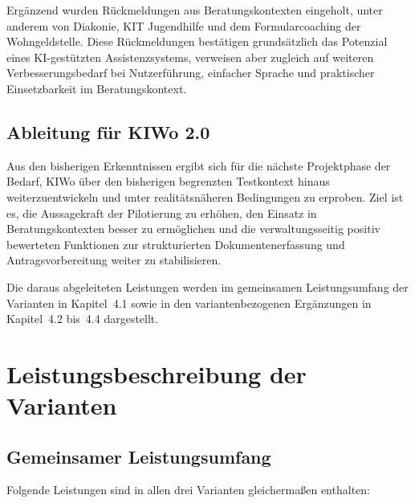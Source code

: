 \documentclass[11pt,a4paper,openany]{report}
\begin{document}
Ergänzend wurden Rückmeldungen aus Beratungskontexten eingeholt, unter
anderem von Diakonie, KIT Jugendhilfe und dem Formularcoaching der
Wohngeldstelle. Diese Rückmeldungen bestätigen grundsätzlich das
Potenzial eines KI-gestützten Assistenzsystems, verweisen aber zugleich
auf weiteren Verbesserungsbedarf bei Nutzerführung, einfacher Sprache
und praktischer Einsetzbarkeit im Beratungskontext.

\section{Ableitung für KIWo 2.0}

Aus den bisherigen Erkenntnissen ergibt sich für die nächste
Projektphase der Bedarf, KIWo über den bisherigen begrenzten Testkontext
hinaus weiterzuentwickeln und unter realitätsnäheren Bedingungen zu
erproben. Ziel ist es, die Aussagekraft der Pilotierung zu erhöhen, den
Einsatz in Beratungskontexten besser zu ermöglichen und die
verwaltungsseitig positiv bewerteten Funktionen zur strukturierten
Dokumentenerfassung und Antragsvorbereitung weiter zu stabilisieren.

Die daraus abgeleiteten Leistungen werden im gemeinsamen Leistungsumfang
der Varianten in Kapitel~4.1 sowie in den variantenbezogenen Ergänzungen
in Kapitel~4.2 bis~4.4 dargestellt.

\chapter{Leistungsbeschreibung der Varianten}

\section{Gemeinsamer Leistungsumfang}

Folgende Leistungen sind in allen drei Varianten gleichermaßen enthalten:
\end{document}
